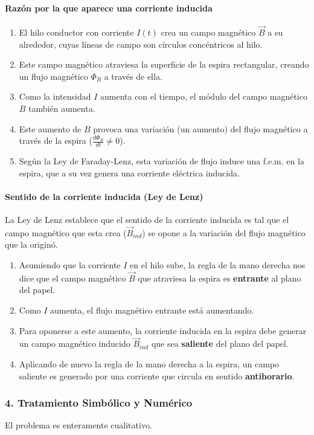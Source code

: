\paragraph*{Razón por la que aparece una corriente inducida}
\begin{enumerate}
    \item El hilo conductor con corriente $I(t)$ crea un campo magnético $\vec{B}$ a su alrededor, cuyas líneas de campo son círculos concéntricos al hilo.
    \item Este campo magnético atraviesa la superficie de la espira rectangular, creando un flujo magnético $\Phi_B$ a través de ella.
    \item Como la intensidad $I$ aumenta con el tiempo, el módulo del campo magnético $B$ también aumenta.
    \item Este aumento de $B$ provoca una variación (un aumento) del flujo magnético a través de la espira ($\frac{d\Phi_B}{dt} \neq 0$).
    \item Según la Ley de Faraday-Lenz, esta variación de flujo induce una f.e.m. en la espira, que a su vez genera una corriente eléctrica inducida.
\end{enumerate}

\paragraph*{Sentido de la corriente inducida (Ley de Lenz)}
La Ley de Lenz establece que el sentido de la corriente inducida es tal que el campo magnético que esta crea ($\vec{B}_{ind}$) se opone a la variación del flujo magnético que la originó.
\begin{enumerate}
    \item Asumiendo que la corriente $I$ en el hilo sube, la regla de la mano derecha nos dice que el campo magnético $\vec{B}$ que atraviesa la espira es \textbf{entrante} al plano del papel.
    \item Como $I$ aumenta, el flujo magnético entrante está aumentando.
    \item Para oponerse a este aumento, la corriente inducida en la espira debe generar un campo magnético inducido $\vec{B}_{ind}$ que sea \textbf{saliente} del plano del papel.
    \item Aplicando de nuevo la regla de la mano derecha a la espira, un campo saliente es generado por una corriente que circula en sentido \textbf{antihorario}.
\end{enumerate}

\subsubsection*{4. Tratamiento Simbólico y Numérico}
El problema es enteramente cualitativo.

